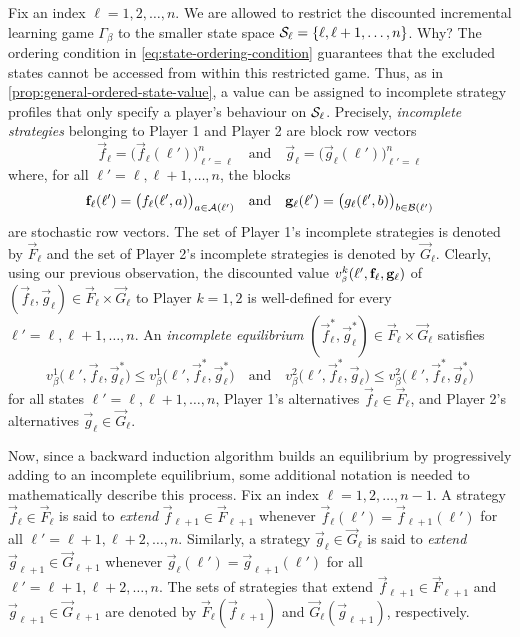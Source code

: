     Fix an index $\ell = 1, 2, \ldots, n$.
    We are allowed to restrict the discounted incremental learning game $\Gamma_\beta$ to the smaller state space $\mathcal{S}_\ell = \{\ell, \ell + 1, \ldots, n\}$.
    Why?
    The ordering condition in \eqref{eq:state-ordering-condition} guarantees that the excluded states cannot be accessed from within this restricted game.
    Thus, as in \autoref{prop:general-ordered-state-value}, a value can be assigned to incomplete strategy profiles that only specify a player's behaviour on $\mathcal{S}_\ell$.
    Precisely, \emph{incomplete strategies} belonging to Player 1 and Player 2 are block row vectors
    \[
        \vec{f}_\ell
            = \big(\vec{f}_\ell(\ell')\big)_{\ell' = \ell}^n
        \quad\text{and}\quad
        \vec{g}_\ell
            = \big(\vec{g}_\ell(\ell')\big)_{\ell' = \ell}^n
    \]
    where, for all $\ell' = \ell, \ell + 1, \ldots, n$, the blocks
    \[
        \mathbf{f}_\ell(\ell')
            = \big(f_\ell(\ell', a)\big)_{a \in \mathcal{A}(\ell')}
        \quad\text{and}\quad
        \mathbf{g}_\ell(\ell')
            = \big(g_\ell(\ell', b)\big)_{b \in \mathcal{B}(\ell')}
    \]
    are stochastic row vectors.
    The set of Player 1's incomplete strategies is denoted by $\vec{F}_\ell$ and the set of Player 2's incomplete strategies is denoted by $\vec{G}_\ell$.
    Clearly, using our previous observation, the discounted value $v_\sbeta^k(\ell', \vec{f}_\ell, \vec{g}_\ell)$ of $(\vec{f}_\ell, \vec{g}_\ell) \in \vec{F}_\ell \times \vec{G}_\ell$ to Player $k = 1, 2$ is well-defined for every $\ell' = \ell, \ell + 1, \ldots, n$.
    An \emph{incomplete equilibrium} $(\vec{f}^*_\ell, \vec{g}^*_\ell) \in \vec{F}_\ell \times \vec{G}_\ell$ satisfies
    \begin{equation}  \label{eq:incomplete-nash-equilibrium}
        v_\beta^1\big(\ell', \vec{f}_\ell, \vec{g}^*_\ell\big)
            \le v_\beta^1\big(\ell', \vec{f}^*_\ell, \vec{g}^*_\ell\big)
        \quad\text{and}\quad
        v_\beta^2\big(\ell', \vec{f}^*_\ell, \vec{g}_\ell\big)
            \le v_\beta^2\big(\ell', \vec{f}^*_\ell, \vec{g}^*_\ell\big)
    \end{equation}
    for all states $\ell' = \ell, \ell + 1, \ldots, n$, Player 1's alternatives $\vec{f}_\ell \in \vec{F}_\ell$, and Player 2's alternatives $\vec{g}_\ell \in \vec{G}_\ell$.

    Now, since a backward induction algorithm builds an equilibrium by progressively adding to an incomplete equilibrium, some additional notation is needed to mathematically describe this process.
    Fix an index $\ell = 1, 2, \ldots, n - 1$.
    A strategy $\vec{f}_\ell \in \vec{F}_\ell$ is said to \emph{extend} $\vec{f}_{\ell + 1} \in \vec{F}_{\ell + 1}$ whenever $\vec{f}_\ell(\ell') = \vec{f}_{\ell + 1}(\ell')$ for all $\ell' = \ell + 1, \ell + 2, \ldots, n$.
    Similarly, a strategy $\vec{g}_\ell \in \vec{G}_\ell$ is said to \emph{extend} $\vec{g}_{\ell + 1} \in \vec{G}_{\ell + 1}$ whenever $\vec{g}_{\ell}(\ell') = \vec{g}_{\ell + 1}(\ell')$ for all $\ell' = \ell + 1, \ell + 2, \ldots, n$.
    The sets of strategies that extend $\vec{f}_{\ell + 1} \in \vec{F}_{\ell + 1}$ and $\vec{g}_{\ell + 1} \in \vec{G}_{\ell + 1}$ are denoted by $\vec{F}_\ell(\vec{f}_{\ell + 1})$ and $\vec{G}_\ell(\vec{g}_{\ell + 1})$, respectively.

